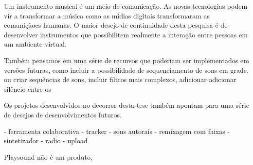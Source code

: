 Um instrumento musical é um meio de comunicação. As novas tecnologias podem vir a transformar a música como as mídias digitais transformaram as comuniçãoes humanas. O maior desejo de continuidade desta pesquisa é de desenvolver instrumentos que possibilitem realmente a interação entre pessoas em um ambiente virtual. 

Também pensamos em uma série de recursos que poderiam ser implementados em versões futuras, como incluir a possibilidade de sequenciamento de sons em grade, ou criar sequências de sons, incluir filtros mais complexos, adicionar adicionar silêncio entre os 




Os projetos desenvolvidos no decorrer desta tese também apontam para uma série de desejos de desenvolvimentos futuros. 

- ferramenta colaborativa
- tracker
- sons autorais
- remixagem com faixas 
- sintetizador
- radio
- upload

Playsound não é um produto, 



